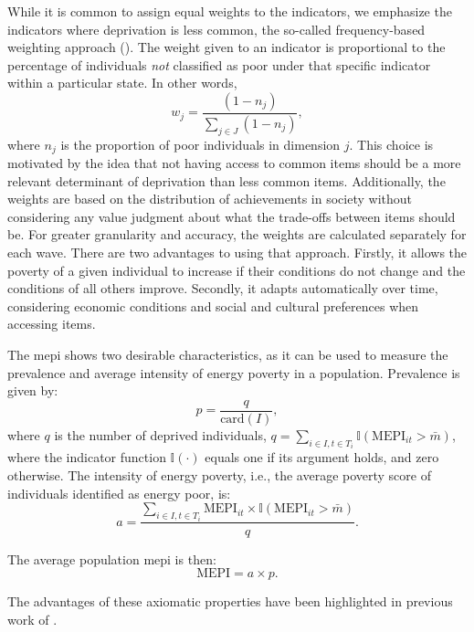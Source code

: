 \documentclass[preprint,authoryear,12pt]{elsarticle}
\newcommand{\citeTwo}[1]{(\cite{#1})}
\begin{document}
While it is common to assign equal weights to the indicators, we emphasize the indicators where deprivation is less common, the so-called frequency-based weighting approach \citeTwo{DL13}. The weight given to an indicator is proportional to the percentage of individuals {\em not} classified as poor under that specific indicator within a particular state. In other words,
\begin{equation}
w_j = \frac{(1 - n_j)}{\sum_{j \in J}(1 - n_j)},
\end{equation}
where $n_j$ is the proportion of poor individuals in dimension $j$. This choice is motivated by the idea that not having access to common items should be a more relevant determinant of deprivation than less common items. Additionally, the weights are based on the distribution of achievements in society without considering any value judgment about what the trade-offs between items should be. For greater granularity and accuracy, the weights are calculated separately for each wave. There are two advantages to using that approach. Firstly, it allows the poverty of a given individual to increase if their conditions do not change and the conditions of all others improve. Secondly, it adapts automatically over time, considering economic conditions and social and cultural preferences when accessing items.

The \Gls{mepi} shows two desirable characteristics, as it can be used to measure the prevalence and average intensity of energy poverty in a population. Prevalence is given by:
\begin{equation}
p = \frac{q}{\text{card}(I)},
\end{equation}
where $q$ is the number of deprived individuals, $q = \sum_{i \in I, t \in T_i} \mathbb{I}\left(\text{MEPI}_{it} > \bar{m}\right)$, where the indicator function $\mathbb{I}(\cdot)$ equals one if its argument holds, and zero otherwise. The intensity of energy poverty, i.e., the average poverty score of individuals identified as energy poor, is:
\begin{equation}
a = \frac{\sum_{i \in I, t \in T_i} \text{MEPI}_{it} \times \mathbb{I}(\text{MEPI}_{it} > \bar{m} )}{q}.
\end{equation}

The average population \Gls{mepi} is then:
\begin{equation}
\text{MEPI} = a \times p.
\end{equation}

The advantages of these axiomatic properties have been highlighted in previous work of \citet{CAF19}.
\end{document}
